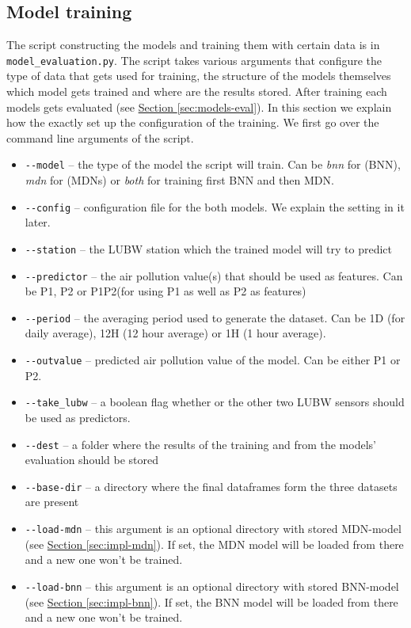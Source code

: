\documentclass[12pt,a4paper,twoside]{scrartcl}
\numberwithin{equation}{section}
\newcommand{\refsec}[1]{\hyperref[#1]{Section \ref*{#1}}}
\begin{document}
\subsection{Model training}\label{sec:models-train}
The script constructing the models and training them with certain data is in \texttt{model\_evaluation.py}. The script takes various arguments that configure the type of data that gets used for training, the structure of the models themselves which model gets trained and where are the results stored. After training each models gets evaluated (see \refsec{sec:models-eval}). In this section we explain how the exactly set up the configuration of the training. We first go over the command line arguments of the script.
\begin{itemize}
\item \texttt{-{}-model} -- the type of the model the script will train. Can be \emph{bnn} for (BNN), \emph{mdn} for (MDNs) or \emph{both} for training first BNN and then MDN.
\item \texttt{-{}-config} -- configuration file for the both models. We explain the setting in it later.
\item \texttt{-{}-station} -- the LUBW station which the trained model will try to predict
\item \texttt{-{}-predictor} -- the air pollution value(s) that should be used as features. Can be P1, P2 or P1P2(for using P1 as well as P2 as features)
\item \texttt{-{}-period} -- the averaging period used to generate the dataset. Can be 1D (for daily average), 12H (12 hour average) or 1H (1 hour average).
\item \texttt{-{}-outvalue} -- predicted air pollution value of the model. Can be either P1 or P2.
\item \texttt{-{}-take\_lubw} -- a boolean flag whether or the other two LUBW sensors should be used as predictors.
\item \texttt{-{}-dest} -- a folder where the results of the training and from the models' evaluation should be stored
\item \texttt{-{}-base-dir} -- a directory where the final dataframes form the three datasets are present
\item \texttt{-{}-load-mdn} -- this argument is an optional directory with stored MDN-model (see \refsec{sec:impl-mdn}). If set, the MDN model will be loaded from there and a new one won't be trained.
\item \texttt{-{}-load-bnn} -- this argument is an optional directory with stored BNN-model (see \refsec{sec:impl-bnn}). If set, the BNN model will be loaded from there and a new one won't be trained.
\end{itemize}
\end{document}
